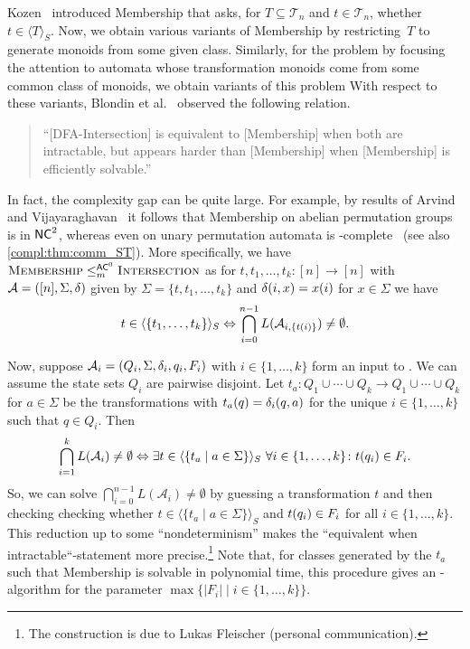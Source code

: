 Kozen~\cite{Kozen77} introduced 
{\sc Membership} that asks, for $T \subseteq \mathcal T_n$ and $t \in \mathcal T_n$,
whether~$t \in \langle T \rangle_S$.
Now, we obtain various variants of {\sc Membership}
by restricting~$T$ to generate monoids from some given class. 
Similarly, for the problem \DFAINT
by focusing the attention to automata whose transformation
monoids come from some common class of monoids,
we obtain variants of this problem
With respect to these variants,
Blondin et al.~\cite{BlondinKM16} observed the following relation.
\begin{quote}
	``[{\sc DFA-Intersection}] is equivalent to [{\sc Membership}] when both are intractable, but appears harder than [{\sc Membership}] when [{\sc Membership}] is efficiently solvable.''~\cite{BlondinKM16}	
\end{quote}
In fact, the complexity gap can be quite large.
For example, by results of Arvind and Vijayaraghavan~\cite{DBLP:conf/coco/ArvindV04} 
it follows that {\sc Membership} on abelian permutation groups 
is in $\NC^2$, whereas \DFAINT even on unary permutation
automata is \NP-complete~\cite{Beaudry88thesis,DBLP:journals/corr/abs-2108-05244,Galil76,MartensN07,Stockmeyer73} (see also \cref{compl:thm:comm_ST}).
More specifically, we have $\text{\sc Membership} \leACZEROm \DFAINT$ as for 
$t, t_1, \ldots, t_k \colon [n] \to [n]$
with $\semiautomat{A}{[n]}{\Sigma}{\delta}$
given by $\Sigma = \{t,t_1, \ldots, t_k\}$
and $\applytrans{\delta}{i}{x} = \applyfunc{i}{x}$ for $x \in \Sigma$
we have
\[
t \in \langle \{ t_1, \ldots, t_k \}\rangle_S
\Leftrightarrow 
\bigcap_{i=0}^{n-1} L(\mathcal A_{i, \{ \applyfunc{i}{t} \}}) \ne \emptyset.
\]

Now, suppose $\automat{A_i}{Q_i}{\Sigma}{\delta_i}{q_i}{F_i}$
with $i \in \{1,\ldots,k\}$ form an input to \DFAINT.
We can assume the state sets $Q_i$ are pairwise disjoint.
Let $t_a \colon Q_1 \cup \cdots \cup Q_k \to Q_1 \cup \cdots \cup Q_k$ for $a \in \Sigma$
be the transformations with $\applyfunc{q}{t_a} = \applytrans{\delta_i}{q}{a}$
for the unique $i \in \{1,\ldots,k\}$ such that $q \in Q_i$.
Then
\[
\bigcap_{i=1}^{k} L(\mathcal A_i) \ne \emptyset 
\Leftrightarrow 
\exists t \in \langle \{ t_a \mid a \in \Sigma \} \rangle_S \  \forall i \in \{1,\ldots,k\} \colon \applyfunc{q_i}{t} \in F_i. 
\]
So, we can solve $\bigcap_{i=0}^{n-1} L(\mathcal A_i) \ne \emptyset$ by guessing a transformation $t$
and then checking
checking whether $t \in \langle \{ t_a \mid a \in \Sigma \} \rangle_S$ and
$\applyfunc{q_i}{t} \in F_i$ 
for all $i \in \{1,\ldots,k\}$.
This reduction up to some ``nondeterminism''
makes the ``equivalent when intractable``-statement more precise.\footnote{The construction is due to Lukas Fleischer (personal communication).}
Note that, for classes generated by the $t_a$ such that {\sc Membership} is solvable in polynomial time,
this procedure gives an \FPT-algorithm for the parameter $\max\{ |F_i| \mid i \in \{1,\ldots,k\}\}$.

